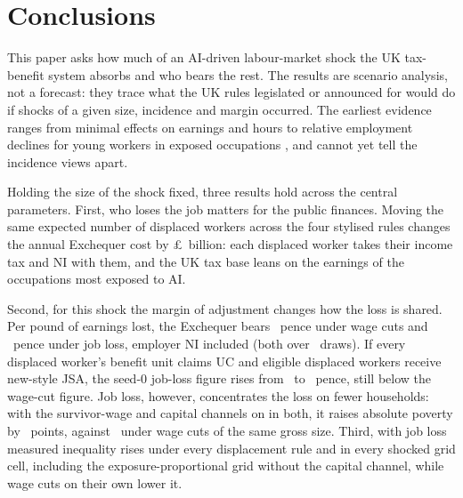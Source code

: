 \section{Conclusions}
\label{sec:discussion}

This paper asks how much of an AI-driven labour-market shock the UK tax-benefit system absorbs and who bears the rest. The results are scenario analysis, not a forecast: they trace what the UK rules legislated or announced for \genSimTaxYear{} would do if shocks of a given size, incidence and margin occurred. The earliest evidence ranges from minimal effects on earnings and hours \citep{humlum2025} to relative employment declines for young workers in exposed occupations \citep{brynjolfsson2025}, and cannot yet tell the incidence views apart.

Holding the size of the shock fixed, three results hold across the central parameters. First, who loses the job matters for the public finances. Moving the same expected number of displaced workers across the four stylised rules changes the annual Exchequer cost by \pounds\genIncStylisedCostSpanBn~billion: each displaced worker takes their income tax and NI with them, and the UK tax base leans on the earnings of the occupations most exposed to AI.

Second, for this shock the margin of adjustment changes how the loss is shared. Per pound of earnings lost, the Exchequer bears \genAbsCutGovPct~pence under wage cuts and \genAbsJobGovDrawsPct~pence under job loss, employer NI included (both over \genWcDraws~draws). If every displaced worker's benefit unit claims UC and eligible displaced workers receive new-style JSA, the seed-0 job-loss figure rises from \genAbsJobGovPct~to \genAbsJobGovJsaPct~pence, still below the wage-cut figure. Job loss, however, concentrates the loss on fewer households: with the survivor-wage and capital channels on in both, it raises absolute poverty by \genWcJobPovBhcMeanPp~points, against \genWcWagePovBhcMeanPp~under wage cuts of the same gross size. Third, with job loss measured inequality rises under every displacement rule and in every shocked grid cell, including the exposure-proportional grid without the capital channel, while wage cuts on their own lower it.

